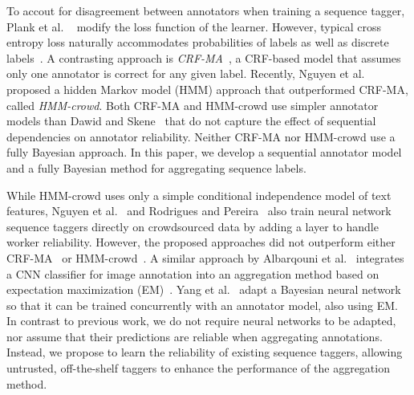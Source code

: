 To accout for disagreement between annotators when training a sequence tagger, Plank et al. ~ 
modify the loss function of the learner.
However, typical cross entropy loss
naturally accommodates probabilities of labels as well as discrete labels~\cite{bekker2016training}.
A contrasting approach is \emph{CRF-MA}~\cite{rodrigues2014sequence},
a CRF-based model that assumes only one annotator is correct for any given label.
Recently, Nguyen et al.~ proposed a hidden Markov model (HMM) approach that outperformed CRF-MA, called \emph{HMM-crowd}.
Both CRF-MA and HMM-crowd use simpler annotator models than Dawid and Skene~
that do not capture the effect of sequential dependencies on annotator reliability.
Neither CRF-MA nor HMM-crowd use a fully Bayesian approach.
In this paper, we develop a sequential annotator model and a fully Bayesian method for aggregating sequence labels.  %

While HMM-crowd uses only a simple conditional independence model of text features,
Nguyen et al.~ and 
Rodrigues and Pereira~ also train 
neural network sequence taggers directly on crowdsourced data
by adding a layer to handle worker reliability.
However, the proposed approaches did not outperform either CRF-MA~\cite{rodrigues2018deep} or HMM-crowd~\cite{nguyen2017aggregating}. 
A similar approach by Albarqouni et al.~
integrates a CNN classifier for image annotation
into an aggregation method based on 
expectation maximization (EM)~\cite{dempster_maximum_1977}.
Yang et al.~  
adapt a Bayesian neural network so that it can be trained concurrently with an annotator model, also using EM. 
In contrast to previous work,
we do not require neural networks to be adapted, 
nor assume that their predictions are reliable 
when aggregating annotations.
Instead, we propose to learn the reliability of  
existing sequence taggers,
allowing untrusted, off-the-shelf taggers to enhance the performance of
the aggregation method. 

